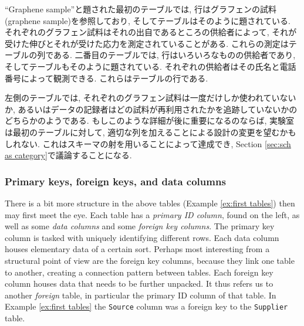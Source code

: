 \begin{example}

``Graphene sample''と題された最初のテーブルでは, 行はグラフェンの試料(graphene sample)を参照しており, そしてテーブルはそのように題されている. それぞれのグラフェン試料はそれの出自であるところの供給者によって, それが受けた伸びとそれが受けた応力を測定されていることがある. これらの測定はテーブルの列である. 二番目のテーブルでは, 行はいろいろなものの供給者であり, そしてテーブルもそのように題されている. それぞれの供給者はその氏名と電話番号によって観測できる. これらはテーブルの行である.


左側のテーブルでは, それぞれのグラフェン試料は一度だけしか使われていないか, あるいはデータの記録者はどの試料が再利用されたかを追跡していないかのどちらかのようである. もしこのような詳細が後に重要になるのならば, 実験室は最初のテーブルに対して, 適切な列を加えることによる設計の変更を望むかもしれない. これはスキーマの射を用いることによって達成でき, Section \ref{sec:sch as category}で議論することになる.

\end{example}


\subsubsection{Primary keys, foreign keys, and data columns}

There is a bit more structure in the above tables (Example \ref{ex:first tables}) then may first meet the eye. Each table has a {\em primary ID column}, found on the left, as well as some {\em data columns} and some {\em foreign key columns}. The primary key column is tasked with uniquely identifying different rows. Each data column houses elementary data of a certain sort. Perhaps most interesting from a structural point of view are the foreign key columns, because they link one table to another, creating a connection pattern between tables. Each foreign key column houses data that needs to be further unpacked. It thus refers us to another {\em foreign} table, in particular the primary ID column of that table. In Example \ref{ex:first tables} the {\tt Source} column was a foreign key to the {\tt Supplier} table.

